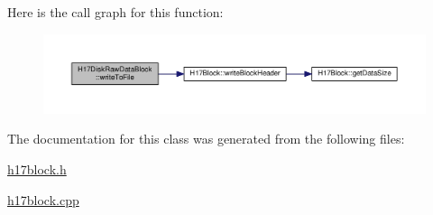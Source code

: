 Here is the call graph for this function\+:\nopagebreak
\begin{figure}[H]
\begin{center}
\leavevmode
\includegraphics[width=350pt]{classH17DiskRawDataBlock_a1f7e142b548e0c6c6b6984fda36571c4_cgraph}
\end{center}
\end{figure}




The documentation for this class was generated from the following files\+:\begin{DoxyCompactItemize}
\item 
\hyperlink{h17block_8h}{h17block.\+h}\item 
\hyperlink{h17block_8cpp}{h17block.\+cpp}\end{DoxyCompactItemize}
